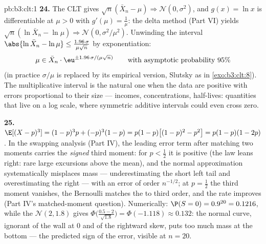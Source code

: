 \begin{solution}{pb:b3:clt:1}
\textbf{24.} The CLT gives $\sqrt n(\bar X_n - \mu)
\Rightarrow \mathcal N(0, \sigma^2)$, and $g(x) = \ln x$ is
differentiable at $\mu > 0$ with $g'(\mu) = \frac1\mu$: the
delta method (Part VI) yields $\sqrt n(\ln\bar X_n - \ln\mu)
\Rightarrow \mathcal N(0, \sigma^2/\mu^2)$. Unwinding the
interval $\abs{\ln\bar X_n - \ln\mu} \leq
\frac{1.96\,\sigma}{\mu\sqrt n}$ by exponentiation:
\[
\mu \in \bar X_n\cdot
\eu^{\pm1.96\,\sigma/(\mu\sqrt n)}
\qquad\text{with asymptotic probability } 95\%
\]
(in practice $\sigma/\mu$ is replaced by its empirical
version, Slutsky as in \cref{exo:b3:clt:8}). The
multiplicative interval is the natural one when the data
are positive with errors proportional to their size ---
incomes, concentrations, half-lives: quantities that live
on a log scale, where symmetric additive intervals could
even cross zero.

\textbf{25.} $\E[(X - p)^3] = (1-p)^3p + (-p)^3(1 - p) =
p(1-p)\bigl[(1-p)^2 - p^2\bigr] = p(1-p)(1 - 2p)$. In the
swapping analysis (Part IV), the leading error term after
matching two moments carries the \emph{signed} third
moment: for $p < \frac12$ it is positive (the law leans
right: rare large excursions above the mean), and the
normal approximation systematically misplaces mass ---
underestimating the short left tail and overestimating the
right --- with an error of order $n^{-1/2}$; at $p =
\frac12$ the third moment vanishes, the Bernoulli matches
the  to third order, and the rate improves (Part
IV's matched-moment question). Numerically: $\P(S = 0) =
0.9^{20} = 0.1216$, while the 
$\mathcal N(2, 1.8)$ gives $\Phi\bigl(\frac{0.5 -
2}{\sqrt{1.8}}\bigr) = \Phi(-1.118) \approx 0.132$: the
normal curve, ignorant of the wall at $0$ and of the
rightward skew, puts too much mass at the bottom --- the
predicted sign of the error, visible at $n = 20$.
\end{solution}
